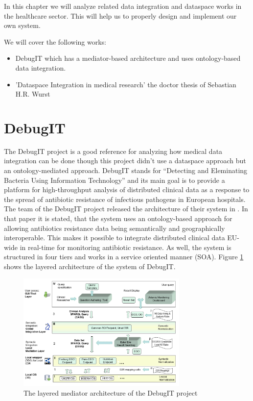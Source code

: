 
In this chapter we will analyze related data integration and dataspace works in the healthcare sector. This will help us to properly design and implement our own system.

We will cover the following works:

\begin{itemize}
\item DebugIT which has a mediator-based architecture and uses ontology-based data integration.
\item 'Dataspace Integration in medical research' the doctor thesis of Sebastian H.R. Wurst
\end{itemize}

\section{DebugIT}
The DebugIT project is a good reference for analyzing how medical data integration can be done though this project didn't use a dataspace approach but an ontology-mediated \cite{WurstDiss, DBLP:books/dp/LeserN2006} approach. DebugIT stands for ``Detecting and Eleminating Bacteria Using Information Technology'' and its main goal is to provide a platform for high-throughput analysis of distributed clinical data as a response to the spread of antibiotic resistance of infectious pathogens in European hospitals\cite{UniFreiburgDebugITInfo}. 
The team of the DebugIT project released the architecture of their system in \cite{DBLP:conf/swat4ls/SchoberCDEDJTPLB14}.
In that paper it is stated, that the system uses an ontology-based approach for allowing antibiotics resistance data being semantically and geographically interoperable. This makes it possible to integrate distributed clinical data EU-wide in real-time for monitoring antibiotic resistance. As well, the system is structured in four tiers and works in a service oriented manner (SOA). Figure \ref{DebugITArchitectureFigure} shows the layered architecture of the system of DebugIT.

\begin{figure}[]
	\begin{center}
		\includegraphics[width=0.75\textwidth]{figures/DebugIT-Ontology-mediated-layered-Data-Integration-architecture.png}
	\end{center}
	\caption{The layered mediator architecture of the DebugIT project}
	\label{DebugITArchitectureFigure}
\end{figure}

